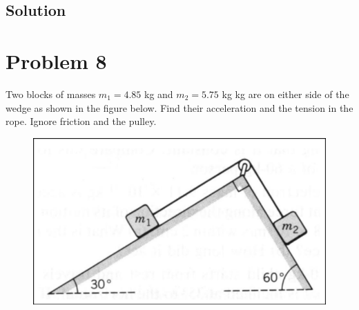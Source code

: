\documentclass{article}
\begin{document}
\subsection*{Solution}


\section*{Problem 8}
Two blocks of masses $m_1 = 4.85$ kg and $m_2 = 5.75$ kg kg are on either side of the wedge as shown in
the figure below. Find their acceleration and the tension in the rope. Ignore friction and the pulley.
\begin{figure}[ht]
    \centering
    \includegraphics[scale=.4]{drawing-6.png}
\end{figure}
\end{document}

